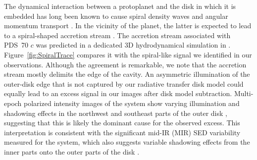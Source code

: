 \documentclass[longauth]{aa}
\newcommand{\vc}[1]{#1}
\newcommand{\new}[1]{#1}
\begin{document}
\new{The dynamical interaction between a protoplanet and the disk in which it is embedded has long been known to cause spiral density waves \citep[][]{ Goldreich1979,Ogilvie2002} and angular momentum transport \citep[][]{Lin1979, Rafikov2002}. In the vicinity of the planet, the latter is expected to lead to a spiral-shaped accretion stream \citep[][]{Lubow1999, Ayliffe2009}. The %
accretion stream associated with %
PDS~70 $c$ was predicted in a dedicated 3D hydrodynamical simulation in \citet{Toci2020}. Figure~\ref{fig:SpiralTrace} compares it with the spiral-like signal we identified in our observations.}
Although the agreement is remarkable, we note that the accretion stream mostly delimits the edge of the cavity. %
An asymmetric %
illumination of the outer-disk edge that is not captured by our radiative transfer disk model could equally lead to an excess signal in our images after disk model subtraction. %
Multi-epoch polarized intensity images of the system show varying illumination and shadowing effects %
in the northwest and southeast parts of the outer disk \citep[e.g., Fig.~A2 in][]{Juillard2022}, suggesting that this is likely the dominant cause for the observed excess. %
This interpretation is consistent with the significant mid-IR (MIR) SED variability measured for the system, \vc{which} also suggests variable shadowing effects from the inner parts onto the outer parts of the disk \citep{Perotti2023}.
\end{document}
